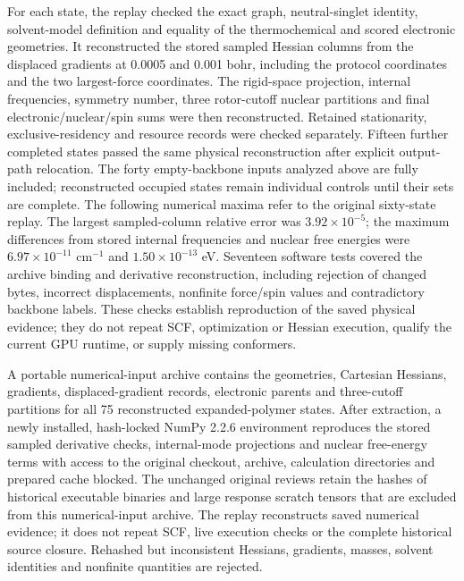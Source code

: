 \documentclass[11pt]{article}
\begin{document}
For each state, the replay checked the exact graph, neutral-singlet identity, solvent-model definition and equality of the thermochemical and scored electronic geometries. It reconstructed the stored sampled Hessian columns from the displaced gradients at 0.0005 and 0.001 bohr, including the protocol coordinates and the two largest-force coordinates. The rigid-space projection, internal frequencies, symmetry number, three rotor-cutoff nuclear partitions and final electronic/nuclear/spin sums were then reconstructed. Retained stationarity, exclusive-residency and resource records were checked separately. Fifteen further completed states passed the same physical reconstruction after explicit output-path relocation. The forty empty-backbone inputs analyzed above are fully included; reconstructed occupied states remain individual controls until their sets are complete. The following numerical maxima refer to the original sixty-state replay. The largest sampled-column relative error was $3.92\times10^{-5}$; the maximum differences from stored internal frequencies and nuclear free energies were $6.97\times10^{-11}$ cm$^{-1}$ and $1.50\times10^{-13}$ eV. Seventeen software tests covered the archive binding and derivative reconstruction, including rejection of changed bytes, incorrect displacements, nonfinite force/spin values and contradictory backbone labels. These checks establish reproduction of the saved physical evidence; they do not repeat SCF, optimization or Hessian execution, qualify the current GPU runtime, or supply missing conformers.

A portable numerical-input archive contains the geometries, Cartesian Hessians, gradients, displaced-gradient records, electronic parents and three-cutoff partitions for all 75 reconstructed expanded-polymer states. After extraction, a newly installed, hash-locked NumPy 2.2.6 environment reproduces the stored sampled derivative checks, internal-mode projections and nuclear free-energy terms with access to the original checkout, archive, calculation directories and prepared cache blocked. The unchanged original reviews retain the hashes of historical executable binaries and large response scratch tensors that are excluded from this numerical-input archive. The replay reconstructs saved numerical evidence; it does not repeat SCF, live execution checks or the complete historical source closure. Rehashed but inconsistent Hessians, gradients, masses, solvent identities and nonfinite quantities are rejected.
\end{document}
